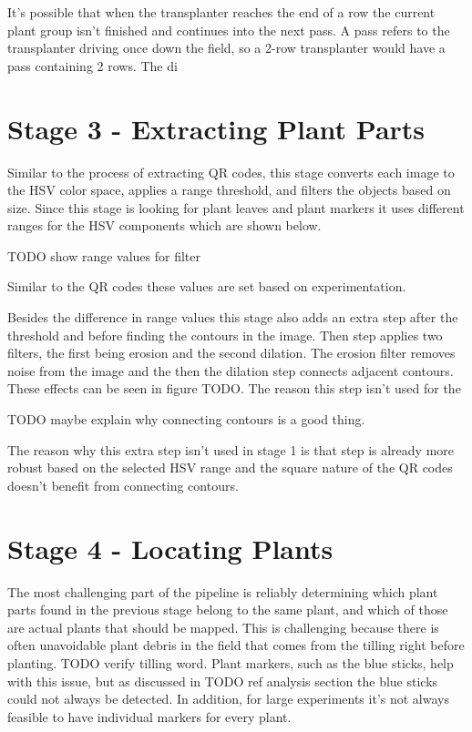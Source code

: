 

It's possible that when the transplanter reaches the end of a row the current plant group isn't finished and continues into the next pass.  A pass refers to the transplanter driving once down the field, so a 2-row transplanter would have a pass containing 2 rows.  The di


\section{Stage 3 - Extracting Plant Parts}
\label{processing-stage3}

Similar to the process of extracting QR codes, this stage converts each image to the HSV color space, applies a range threshold, and filters the objects based on size.  Since this stage is looking for plant leaves and plant markers it uses different ranges for the HSV components which are shown below.  

TODO show range values for filter

Similar to the QR codes these values are set based on experimentation.  

Besides the difference in range values this stage also adds an extra step after the threshold and before finding the contours in the image.  Then step applies two filters, the first being erosion and the second dilation.  The erosion filter removes noise from the image and the then the dilation step connects adjacent contours.  These effects can be seen in figure TODO.  The reason this step isn't used for the 

TODO maybe explain why connecting contours is a good thing.

The reason why this extra step isn't used in stage 1 is that step is already more robust based on the selected HSV range and the square nature of the QR codes doesn't benefit from connecting contours.   

\section{Stage 4 - Locating Plants}
\label{processing-stage4}

The most challenging part of the pipeline is reliably determining which plant parts found in the previous stage belong to the same plant, and which of those are actual plants that should be mapped.  This is challenging because there is often unavoidable plant debris in the field that comes from the tilling right before planting. TODO verify tilling word.  Plant markers, such as the blue sticks, help with this issue, but as discussed in TODO ref analysis section the blue sticks could not always be detected.  In addition, for large experiments it's not always feasible to have individual markers for every plant.  

